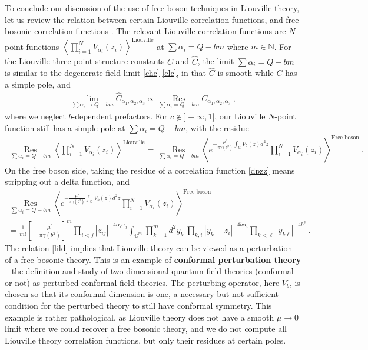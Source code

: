 \documentclass[12pt, a4paper, notitlepage, twoside]{report}
\numberwithin{equation}{section}
\theoremstyle{break}
\begin{document}
To conclude our discussion of the use of free boson techniques in Liouville theory, let us review
the relation between certain Liouville correlation functions, and free bosonic correlation functions \cite{zz95}.
The relevant Liouville correlation functions are $N$-point functions $\left\langle \prod_{i=1}^N V_{\alpha_i}(z_i)\right\rangle^{\text{Liouville}}$ at $\sum\alpha_i = Q-bm$ where $m\in \mathbb{N}$.  
For the Liouville three-point structure constants $C$ and $\hat C$, the limit $\sum\alpha_i = Q-bm$ is similar to the degenerate field limit \eqref{chc}-\eqref{clc}, in that $\hat C$ is smooth while $C$ has a simple pole, and
\begin{align}
 \lim_{\sum\alpha_i \to Q-bm} \hat C_{\alpha_1,\alpha_2,\alpha_3} 
 \propto \underset{\sum \alpha_i = Q-bm}{\operatorname{Res}}  C_{\alpha_1,\alpha_2,\alpha_3}\ ,
\end{align}
where we neglect $b$-dependent prefactors. 
For $c\notin ]-\infty,1]$, our Liouville $N$-point function still has a simple pole at $\sum\alpha_i = Q-bm$, with the residue
\begin{align}
 \underset{\sum \alpha_i = Q-bm}{\operatorname{Res}} \left\langle \prod_{i=1}^N V_{\alpha_i}(z_i)\right\rangle^{\text{Liouville}} = \underset{\sum\alpha_i = Q-bm}{\operatorname{Res}} \left\langle e^{-\frac{\mu^b}{\pi\gamma(b^2)}\int_{\mathbb{C}} V_b(z)d^2z}\prod_{i=1}^N V_{\alpha_i}(z_i)\right\rangle^{\text{Free boson}}\ .
\label{lild}
\end{align}
On the free boson side, taking the residue of a correlation function \eqref{dpzz} means stripping out a delta function, and 
\begin{multline}
 \underset{\sum\alpha_i = Q-bm}{\operatorname{Res}} \left\langle e^{-\frac{\mu^b}{\pi\gamma(b^2)}\int_{\mathbb{C}} V_b(z)d^2z}\prod_{i=1}^N V_{\alpha_i}(z_i)\right\rangle^{\text{Free boson}}
\\
= \frac{1}{m!}\left[-\frac{\mu^b}{\pi\gamma(b^2)}\right]^m \prod_{i<j} |z_{ij}|^{-4\alpha_i\alpha_j} \int_{{\mathbb{C}}^m} \prod_{k=1}^m d^2y_k\ \prod_{k,i} |y_k-z_i|^{-4b\alpha_i}\prod_{k<\ell} |y_{k\ell}|^{-4b^2}\ .
\label{mint}
\end{multline}
The relation \eqref{lild} implies that Liouville theory can be viewed as a perturbation of a free bosonic theory.
This is an example of \textbf{\boldmath conformal perturbation theory} -- the definition and study of two-dimensional quantum field theories (conformal or not) as perturbed conformal field theories.
The perturbing operator, here $V_b$, is chosen so that its conformal dimension is one, a necessary but not sufficient condition for the perturbed theory to still have conformal symmetry.
This example is rather pathological, as Liouville theory does not have a smooth $\mu\to 0$ limit where we could recover a free bosonic theory, and we do not compute all Liouville theory correlation functions, but only their residues at certain poles. 
\end{document}
